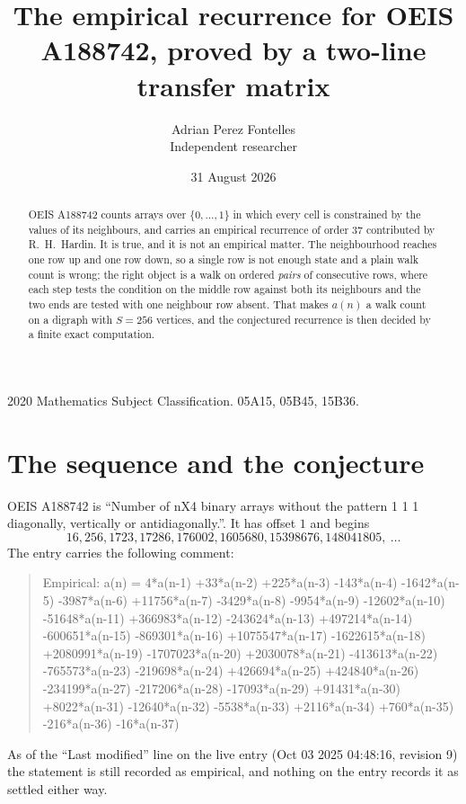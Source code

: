 \documentclass[11pt,a4paper]{article}
\title{The empirical recurrence for OEIS A188742, proved by a two-line transfer matrix}
\author{Adrian Perez Fontelles\\ \small Independent researcher}
\date{31 August 2026}
\theoremstyle{plain}
\theoremstyle{definition}
\begin{document}
\maketitle

\begin{abstract}
OEIS A188742 counts arrays over $\{0,\dots,1\}$ in which every cell is constrained by the
values of its neighbours, and carries an empirical recurrence of order $37$ contributed
by R.~H.~Hardin. It is true, and it is not an empirical matter. The neighbourhood reaches one
row up and one row down, so a single row is not enough state and a plain walk count
is wrong; the right object is a walk on ordered \emph{pairs} of consecutive rows, where
each step tests the condition on the middle row against both its neighbours and the two
ends are tested with one neighbour row absent. That makes $a(n)$ a walk count on a digraph
with $S=256$ vertices, and the conjectured recurrence is then decided by a finite exact
computation.
\end{abstract}

\noindent\small 2020 Mathematics Subject Classification. 05A15, 05B45, 15B36.\normalsize

\section{The sequence and the conjecture}

OEIS A188742 is ``Number of nX4 binary arrays without the pattern 1 1 1 diagonally, vertically or antidiagonally.''. It has offset $1$ and begins
\[
16, 256, 1723, 17286, 176002, 1605680, 15398676, 148041805,\ \dots
\]
The entry carries the following comment:
\begin{quote}\small
Empirical: a(n) = 4*a(n-1) +33*a(n-2) +225*a(n-3) -143*a(n-4) -1642*a(n-5) -3987*a(n-6) +11756*a(n-7) -3429*a(n-8) -9954*a(n-9) -12602*a(n-10) -51648*a(n-11) +366983*a(n-12) -243624*a(n-13) +497214*a(n-14) -600651*a(n-15) -869301*a(n-16) +1075547*a(n-17) -1622615*a(n-18) +2080991*a(n-19) -1707023*a(n-20) +2030078*a(n-21) -413613*a(n-22) -765573*a(n-23) -219698*a(n-24) +426694*a(n-25) +424840*a(n-26) -234199*a(n-27) -217206*a(n-28) -17093*a(n-29) +91431*a(n-30) +8022*a(n-31) -12640*a(n-32) -5538*a(n-33) +2116*a(n-34) +760*a(n-35) -216*a(n-36) -16*a(n-37)
\end{quote}
As of the ``Last modified'' line on the live entry (Oct 03 2025 04:48:16, revision 9) the statement is
still recorded as empirical, and nothing on the entry records it as settled either way.
\end{document}
